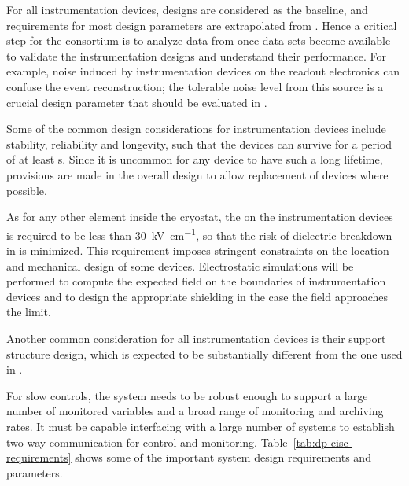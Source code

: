 
For all \lar instrumentation devices,  designs are
considered as the baseline, and requirements for most design
parameters are extrapolated from . Hence a critical step for
the  consortium is to analyze data from  once data sets become  available
to validate the instrumentation designs and understand their
performance. For example, noise induced by instrumentation devices on the readout electronics  can confuse the event reconstruction; the tolerable noise level from this source is a crucial design parameter that should be evaluated in .

Some of the common design considerations for
instrumentation devices include stability, reliability and longevity, 
such that the devices can survive for a period of at least \dunelifetime{}s.  Since it is uncommon for any device
to have such a long lifetime, provisions are made in the overall
design to allow replacement of devices where possible.

As for any other element inside the cryostat, 
the \efield on the instrumentation devices is 
required to be less than \SI{30}{kV\per\cm},
so that the risk of dielectric breakdown in  is minimized.
This requirement imposes stringent constraints on the location and mechanical 
design of some devices. Electrostatic simulations  
will be performed to compute the expected field on the boundaries of 
instrumentation devices and to design the appropriate \efield shielding
in the case the field approaches the limit. 

Another common consideration for all instrumentation devices is their support structure
design, which is expected to be substantially different from the one used in .

For slow controls, the system needs to be %
robust enough to support a large number of monitored variables and a broad range of
monitoring and archiving rates. It must be capable %
interfacing 
with a large number of systems to establish two-way communication for
control and monitoring.  
Table~\ref{tab:dp-cisc-requirements} shows
some of the important  system design requirements and parameters.

